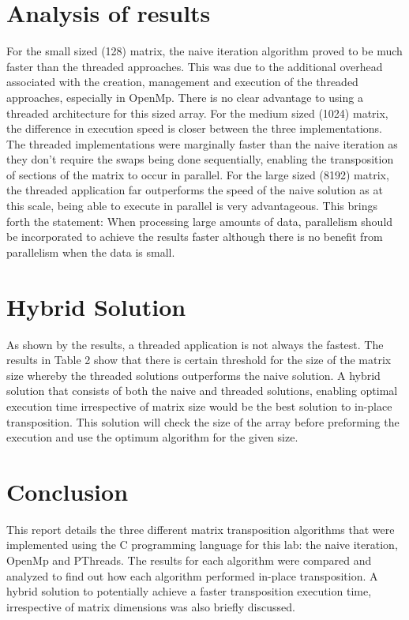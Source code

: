 \documentclass[10pt,onecolumn]{article}
\begin{document}
    \newpage
    
    \section{Analysis of results}
    For the small sized (128) matrix, the naive iteration algorithm proved to be much faster than the threaded approaches. This was due to the additional overhead associated with the creation, management and execution of the threaded approaches, especially in OpenMp. There is no clear advantage to using a threaded architecture for this sized array. For the medium sized (1024) matrix, the difference in execution speed is closer between the three implementations. The threaded implementations were marginally faster than the naive iteration as they don’t require the swaps being done sequentially, enabling the transposition of sections of the matrix to occur in parallel. For the large sized (8192) matrix, the threaded application far outperforms the speed of the naive solution as at this scale, being able to execute in parallel is very advantageous. This brings forth the statement: When processing large amounts of data, parallelism should be incorporated to achieve the results faster although there is no benefit from parallelism when the data is small.\\
    
    \section{Hybrid Solution}
    As shown by the results, a threaded application is not always the fastest. The results in Table 2 show that there is certain threshold for the size of the matrix size whereby the threaded solutions outperforms the naive solution. A hybrid solution that consists of both the naive and threaded solutions, enabling optimal execution time irrespective of matrix size would be the best solution to in-place transposition. This solution will check the size of the array before preforming the execution and use the optimum algorithm for the given size.
    
    \section{Conclusion}
    This report details the three different matrix transposition algorithms that were implemented using the C programming language for this lab: the naive iteration, OpenMp and PThreads. The results for each algorithm were compared and analyzed to find out how each algorithm performed in-place transposition. A hybrid solution to potentially achieve a faster transposition execution time, irrespective of matrix dimensions was also briefly discussed.
    
\end{document}
